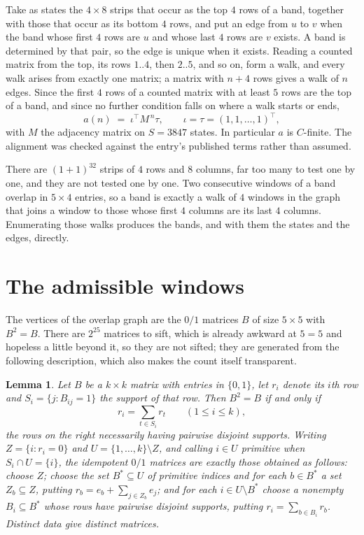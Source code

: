 \documentclass[11pt,a4paper]{article}
\theoremstyle{plain}
\newtheorem{lemma}[theorem]{Lemma}
\theoremstyle{definition}
\begin{document}
Take as states the $4\times8$ strips that occur as the top $4$ rows of a band,
together with those that occur as its bottom $4$ rows, and put an edge from $u$ to $v$
when the band whose first $4$ rows are $u$ and whose last $4$ rows are $v$ exists.
A band is determined by that pair, so the edge is unique when it exists. Reading a counted
matrix from the top, its rows $1..4$, then $2..5$, and so on, form a walk, and every
walk arises from exactly one matrix; a matrix with $n+4$ rows gives a walk of $n$ edges.
Since the first $4$ rows of a counted matrix with at least $5$ rows are the top of a
band, and since no further condition falls on where a walk starts or ends,
\[
a(n)\;=\;\iota^{\!\top}M^{\,n}\tau ,\qquad \iota=\tau=(1,1,\dots,1)^{\!\top},
\]
with $M$ the adjacency matrix on $S=3847$ states. In particular $a$ is $C$-finite. The
alignment was checked against the entry's published terms rather than assumed.

There are $(1 + 1)^{32}$ strips of $4$ rows and $8$ columns, far too
many to test one by one, and they are not tested one by one. Two consecutive windows of a band
overlap in $5\times4$ entries, so a band is exactly a walk of $4$ windows in
the graph that joins a window to those whose first $4$ columns are its last $4$
columns. Enumerating those walks produces the bands, and with them the states and the edges,
directly.

\section{The admissible windows}

The vertices of the overlap graph are the $0/1$ matrices $B$ of size $5\times5$ with
$B^2=B$. There are $2^{25}$ matrices to sift, which is already awkward at $5=5$ and
hopeless a little beyond it, so they are not sifted; they are generated from the following
description, which also makes the count itself transparent.

\begin{lemma}\label{lem:idem}
Let $B$ be a $k\times k$ matrix with entries in $\{0,1\}$, let $r_i$ denote its $i$th row and
$S_i=\{j:B_{ij}=1\}$ the support of that row. Then $B^2=B$ if and only if
\[
r_i=\sum_{t\in S_i}r_t \qquad (1\le i\le k),
\]
the rows on the right necessarily having pairwise disjoint supports. Writing
$Z=\{i:r_i=0\}$ and $U=\{1,\dots,k\}\setminus Z$, and calling $i\in U$ \emph{primitive}
when $S_i\cap U=\{i\}$, the idempotent $0/1$ matrices are exactly those obtained as follows:
choose $Z$; choose the set $B^{\ast}\subseteq U$ of primitive indices and for each
$b\in B^{\ast}$ a set $Z_b\subseteq Z$, putting $r_b=e_b+\sum_{j\in Z_b}e_j$; and for each
$i\in U\setminus B^{\ast}$ choose a nonempty $B_i\subseteq B^{\ast}$ whose rows have
pairwise disjoint supports, putting $r_i=\sum_{b\in B_i}r_b$. Distinct data give distinct
matrices.
\end{lemma}
\end{document}
